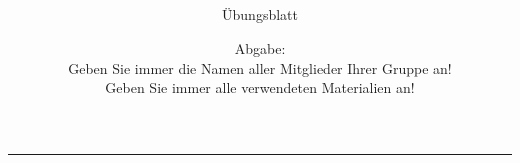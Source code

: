 \begin{titlepage}
	\subject{\dozent}
	\title{\veranstaltung \\ \semester\\ }
	\subtitle{\Large Übungsblatt \ubungNo }
	\date{\Large Abgabe: \abgDatum \\ Geben Sie immer die Namen aller Mitglieder Ihrer Gruppe an! \\ Geben Sie immer alle verwendeten Materialien an!}
\end{titlepage}

\maketitle								%
\vspace*{-11cm}							%

\vspace{8cm}							%
\rule{\linewidth}{0.8pt}				%
